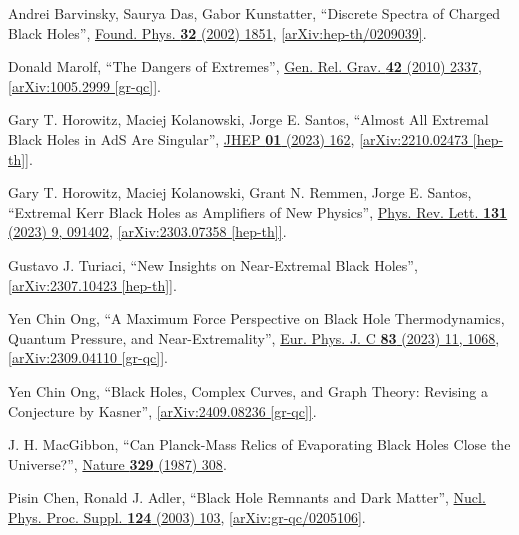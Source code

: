 \documentclass[12pt,preprintnumbers, floatfix, preprintnumbers, letterpaper, superscriptaddress,nofootinbib]{revtex4-2}
\begin{document}
\begin{thebibliography}{99}
Andrei Barvinsky, Saurya Das, Gabor Kunstatter, ``Discrete Spectra of Charged Black Holes'', {\href{https://link.springer.com/article/10.1023/A:1022314632647}{Found. Phys. \textbf{32} (2002) 1851}}, \href{https://arxiv.org/abs/hep-th/0209039}{[arXiv:hep-th/0209039]}.

Donald Marolf, ``The Dangers of Extremes'', {\href{https://link.springer.com/article/10.1007/s10714-010-1027-z}{Gen. Rel. Grav. \textbf{42} (2010) 2337}}, \href{https://arxiv.org/abs/1005.2999}{[arXiv:1005.2999 [gr-qc]]}.

Gary T. Horowitz, Maciej Kolanowski, Jorge E. Santos, ``Almost All Extremal Black Holes in AdS Are Singular'', {\href{https://link.springer.com/article/10.1007/JHEP01(2023)162}{JHEP \textbf{01} (2023) 162}}, \href{https://arxiv.org/abs/2210.02473}{[arXiv:2210.02473 [hep-th]]}. 

Gary T. Horowitz, Maciej Kolanowski, Grant N. Remmen, Jorge E. Santos, ``Extremal Kerr Black Holes as Amplifiers of New Physics'', {\href{https://journals.aps.org/prl/abstract/10.1103/PhysRevLett.131.091402}{Phys. Rev. Lett. \textbf{131} (2023) 9, 091402}}, \href{https://arxiv.org/abs/2303.07358}{[arXiv:2303.07358 [hep-th]]}.

Gustavo J. Turiaci, ``New Insights on Near-Extremal Black Holes'', \href{https://arxiv.org/abs/2307.10423}{[arXiv:2307.10423 [hep-th]]}.

Yen Chin Ong, ``A Maximum Force Perspective on Black Hole Thermodynamics, Quantum Pressure, and Near-Extremality'', {\href{https://link.springer.com/article/10.1140/epjc/s10052-023-12253-9}{Eur. Phys. J. C \textbf{83} (2023) 11, 1068}}, \href{https://arxiv.org/abs/2309.04110}{[arXiv:2309.04110 [gr-qc]]}.

Yen Chin Ong, ``Black Holes, Complex Curves, and Graph Theory: Revising a Conjecture by Kasner'', \href{https://arxiv.org/abs/2409.08236}{[arXiv:2409.08236 [gr-qc]]}.

J. H. MacGibbon, ``Can Planck-Mass Relics of Evaporating Black Holes Close the Universe?'', {\href{https://www.nature.com/articles/329308a0}{Nature \textbf{329} (1987) 308}}.

Pisin Chen, Ronald J. Adler, ``Black Hole Remnants and Dark Matter'', {\href{https://www.sciencedirect.com/science/article/abs/pii/S0920563203020887?via\%3Dihub}{Nucl. Phys. Proc. Suppl. \textbf{124} (2003) 103}}, \href{https://arxiv.org/abs/gr-qc/0205106}{[arXiv:gr-qc/0205106]}.


\end{thebibliography}
\end{document}
